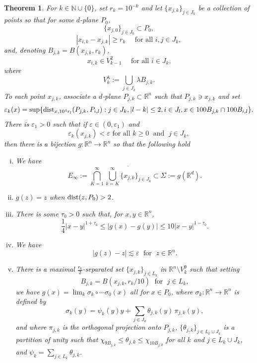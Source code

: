 \documentclass[11pt]{amsart}
\newcommand{\R}{{\mathbb R}}       %
\newcommand{\N}{{\mathbb N}}       %
\newcommand{\dist}{{\rm dist}}
\newcommand{\ve}{{\varepsilon}}
\newtheorem{theorem}{Theorem}[section]
\theoremstyle{definition}
\theoremstyle{remark}
\numberwithin{equation}{section}
\def\lec{\lesssim}
\def\lec{\lesssim}
\newcommand{\hdis}[1]{{\mbox{\dist}}_{#1}}
\begin{document}
\begin{theorem}\cite{DT12}\label{teo61}
	For $k\in \N\cup\{0\}$, set $r_{k}=10^{-k}$ and let $\{x_{j,k}\}_{j\in J_{k}}$ be a collection of points so that for some $d$-plane $P_{0}$,
	\[\{x_{j,0}\}_{j\in J_{0}}\subset P_{0},\] 
	\[|x_{i,k}-x_{j,k}|\geq r_{k} \quad\mbox{ for all $i,j\in J_k$},\]
	and, denoting $B_{j,k}=B(x_{j,k},r_{k})$, 
	\begin{equation}
	x_{i,k}\in V_{k-1}^{2}\quad\mbox{ for all $i\in J_k$,}
	\label{V2}
	\end{equation}
	where
	\[ V_{k}^{\lambda}:=\bigcup_{j\in J_{k}}\lambda B_{j,k}.\]
	To each point $x_{j,k}$, associate a $d$-plane $P_{j,k}\subset \R^n$  
	{such that $P_{j,k} \ni x_{j,k}$}
	and set
	\[
	\ve_{k}(x)=\sup\{\hdis{x,10^{4}r_{l}}(P_{j,k},P_{i,l}): j\in J_{k}, |l-k|\leq 2, i\in J_{l}, 
	x\in 100 B_{j,k}\cap 100 B_{i,l}\}.
	\]
	There is $\ve_{1}>0$ such that if $\ve\in (0,\ve_{1})$ and 
	\begin{equation}
	\label{e:vek<ve}
	\ve_{k}(x_{j,k})<\ve \mbox{ for all }k\geq 0\;\mbox{ and }\;j\in J_{k},
	\end{equation}
	then there is a bijection $g:\R^{n}\rightarrow \R^{n}$ so that the following hold
	\begin{enumerate}[(i)]
		\item We have 
		\begin{equation}\label{eqahj0}
		E_{\infty}:=\bigcap_{K=1}^{\infty}\overline{\bigcup_{k= K}^{\infty} \{x_{j,k}\}_{j\in J_{k}}}\subset \Sigma:= g(\R^{d}).
		\end{equation}
		\item $g(z)=z$ when $\dist(z,P_{0})>2$.
		\item {There is some $\tau_0>0$} such that, for $x,y\in \R^{n}$,
		\[ \frac{1}{4}|x-y|^{1+\tau_0}\leq |g(x)-g(y)|\leq 10|x-y|^{1-\tau_0}.\]
		\item We have 
		\begin{equation}
		\label{e:gz-z}
		|g(z)-z|\lec \ve \;\mbox{ for }\;z\in \R^{n}.
		\end{equation}
		\item There is a maximal $\frac{r_{k}}{2}$-separated set $\{x_{j,k}\}_{j\in L_{k}}$ in $\R^{n}\setminus V_{k}^{9}$ such that setting
		\[
		B_{j,k}=B(x_{j,k},r_{k}/10)\; \mbox{ for $\;j\in L_{k}$},\] 
		we have $g(x)=\lim_{k} \sigma_{k}\circ\cdots \sigma_{0}(x)$ all for $x\in P_0$, where 
		$\sigma_k:\R^n\to\R^n$ is defined by
		\begin{equation}
		\sigma_{k}(y)=\psi_{k}(y)y+\sum_{j\in J_{k}}\theta_{j,k}(y)\, \pi_{j,k}(y),
		\label{e:sigmak}
		\end{equation}
		and where $\pi_{j,k}$ is the orthogonal projection onto $P_{j,k}$,
		$\{\theta_{j,k}\}_{j\in L_{k}\cup J_{k}}$ is a partition of unity such that $\chi_{9B_{j,k}}\leq \theta_{j,k}\leq \chi_{10 B_{j,k}}$ for all $k$ and $j\in L_{k}\cup J_{k}$, and $\psi_{k}=\sum_{j\in L_{k}}\theta_{j,k}$. 
		 

\end{enumerate}
\end{theorem}
\end{document}
